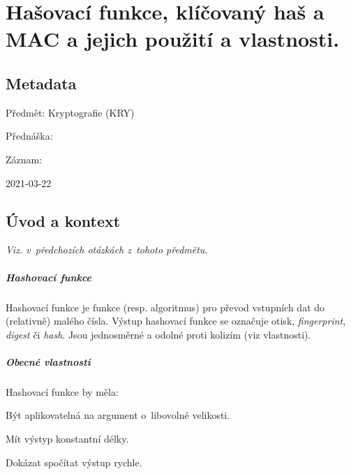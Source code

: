 

\chapter{Hašovací funkce, klíčovaný haš a MAC a jejich použití a vlastnosti.}


\section{Metadata}

\begin{compactitem}
    \item Předmět: Kryptografie (KRY)
    \item Přednáška:
    \begin{compactitem}
        \item {}
    \end{compactitem}
    \item Záznam:
    \begin{compactitem}
        \item 2021-03-22
    \end{compactitem}
\end{compactitem}


\section{Úvod a kontext}

\textit{Viz.  v~předchozích otázkách z~tohoto předmětu.}

\paragraph*{Hashovací funkce} Hashovací funkce je funkce (resp. algoritmus) pro převod vstupních dat do (relativně) malého čísla. Výstup hashovací funkce se označuje otisk, \textit{fingerprint}, \textit{digest} či \textit{hash}. Jsou jednosměrné a odolné proti kolizím (viz vlastnosti).

\paragraph*{Obecné vlastnosti} Hashovací funkce by měla: \begin{compactitem}
    \item Být aplikovatelná na argument o~libovolné velikosti.
    \item Mít výstyp konstantní délky.
    \item Dokázat spočítat výstup rychle.
\end{compactitem}

